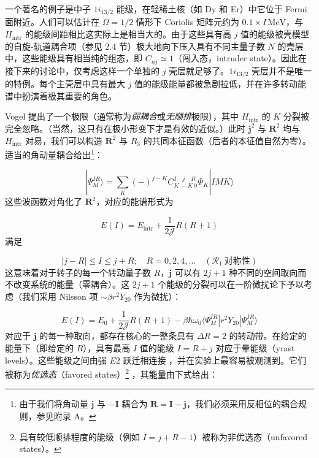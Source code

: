 一个著名的例子是中子 $1i_{13/2}$ 能级，在轻稀土核（如 Dy 和 Er）中它位于 Fermi 面附近。人们可以估计在
$\Omega=1/2$ 情形下 Coriolis 矩阵元约为 $0.1\times I\,\text{MeV}$，与 $H_{\text{intr}}$
的能级间距相比这实际上是相当大的。由于这些具有高 $j$ 值的能级被壳模型的自旋-轨道耦合项（参见 2.4 节）极大地向下压入具有不同主量子数
$N$ 的壳层中，这些能级具有相当纯的组态，即 $C_{nj}\simeq1$（闯入态，intruder state）。因此在接下来的讨论中，仅考虑这样一个单独的
$j$ 壳层就足够了。$1i_{13/2}$ 壳层并不是唯一的特例。每个主壳层中具有最大 $j$ 值的能级能量都被急剧拉低，并在许多转动能谱中扮演着极其重要的角色。

Vogel \cite{Vo70} 提出了一个极限（通常称为\emph{弱耦合}或\emph{无顺排}极限），其中 $H_{\text{intr}}$
的 $K$ 分裂被完全忽略。（当然，这只有在极小形变下才是有效的近似。）此时 $\boldsymbol{j}^{2}$ 与 $\boldsymbol{R}^{2}$
均与 $H_{\text{intr}}$ 对易，我们可以构造 $\boldsymbol{R}^{2}$ 与 $R_{3}$ 的共同本征函数（后者的本征值自然为零）。适当的角动量耦合给出\footnote{由于我们将角动量 $\boldsymbol{j}$ 与 $-\boldsymbol{I}$ 耦合为 $\boldsymbol{R}=\boldsymbol{I}-\boldsymbol{j}$，我们必须采用反相位的耦合规则，参见附录
A。}：

\begin{equation}
|\Psi^{IR}_{M}\rangle=\sum_{K}(-)^{j-K}C^{I\quad j\quad R}_{K\ -K\ 0}\Phi_{K}|IMK\rangle\label{eq:3.34}
\end{equation}
这些波函数对角化了 $\boldsymbol{R}^{2}$，对应的能谱形式为

\begin{equation}
E(I)=E_{\text{intr}}+\frac{1}{2\mathcal{J}}R(R+1)\label{eq:3.35}
\end{equation}
满足

\begin{equation}
|j-R|\leqslant I\leqslant j+R;\quad R=0,2,4,\dots\quad(\mathcal{R}_{1}\ \text{对称性})\label{eq:3.36}
\end{equation}
这意味着对于转子的每一个转动量子数 $R$，$\boldsymbol{j}$ 可以有 $2j+1$ 种不同的空间取向而不改变系统的能量（零耦合）。这
$2j+1$ 个能级的分裂可以在一阶微扰论下予以考虑（我们采用 Nilsson 项 $\sim\beta r^{2}Y_{20}$
作为微扰）：

\begin{equation}
E(I)=E_{0}+\frac{1}{2\mathcal{J}}R(R+1)-\beta\hbar\omega_{0}\langle\Psi^{IR}_{M}|r^{2}Y_{20}|\Psi^{IR}_{M}\rangle\label{eq:3.37}
\end{equation}
对应于 $\boldsymbol{j}$ 的每一种取向，都存在核心的一整条具有 $\Delta R=2$ 的转动带。在给定的能量下（即给定的
$R$），具有最高 $I$ 值的能级 $I=R+j$ 对应于晕能级（yrast levels）。这些能级之间由强 $E2$
跃迁相连接 \cite{Re75a}，并在实验上最容易被观测到。它们被称为\emph{优选态}（favored states）\footnote{具有较低顺排程度的能级（例如 $I=j+R-1$）被称为非优选态（unfavored states）。}
\cite{St75a}，其能量由下式给出：

